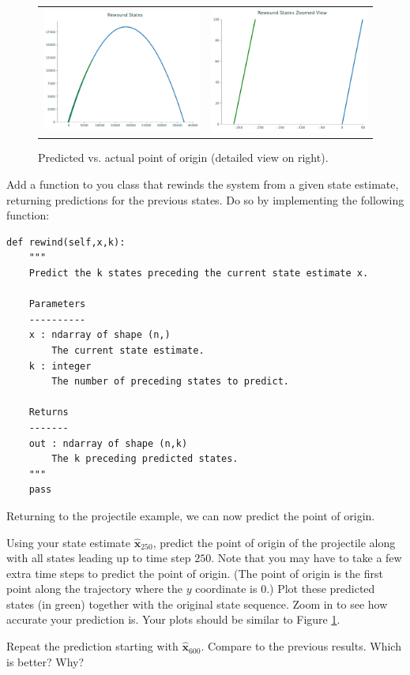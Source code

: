 \begin{figure}[htb]
    \centering
    \begin{tabular}{cc}
    \includegraphics[width=.45\textwidth]{figures/origin_macro} &
    \includegraphics[width=.45\textwidth]{figures/origin_micro}
    \end{tabular}
    \caption{Predicted vs. actual point of origin (detailed view on right).}
    \label{fig:origin}
\end{figure}

\begin{problem}
Add a function to you class that rewinds the system from a given state estimate, returning predictions for the previous states.
Do so by implementing the following function:
\begin{lstlisting}
def rewind(self,x,k):
    """
    Predict the k states preceding the current state estimate x.

    Parameters
    ----------
    x : ndarray of shape (n,)
        The current state estimate.
    k : integer
        The number of preceding states to predict.

    Returns
    -------
    out : ndarray of shape (n,k)
        The k preceding predicted states.
    """
    pass
\end{lstlisting}
\end{problem}

Returning to the projectile example, we can now predict the point of origin.

\begin{problem}
Using your state estimate $\widehat{\mathbf{x}}_{250}$, predict the point of origin of the projectile along with
all states leading up to time step $250$. Note that you may have to take a few extra time steps to predict the point of origin.
(The point of origin is the first point along the trajectory where the $y$ coordinate is $0$.)
Plot these predicted states (in green) together with the original state sequence.
Zoom in to see how accurate your prediction is.
Your plots should be similar to Figure \ref{fig:origin}.
\label{prob:origin_pt}

Repeat the prediction starting with $\widehat{\mathbf{x}}_{600}$.  Compare to the previous results.  Which is better?  Why?
\end{problem}
